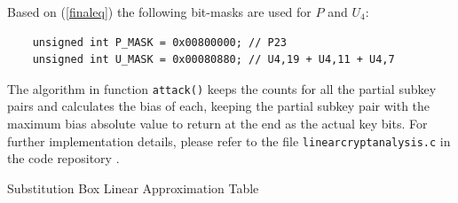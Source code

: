 \documentclass[11pt]{article}
\begin{document}
Based on (\ref{finaleq}) the following bit-masks are used for $P$ and $U_4$:

\begin{lstlisting}
	unsigned int P_MASK = 0x00800000; // P23
	unsigned int U_MASK = 0x00080880; // U4,19 + U4,11 + U4,7 
\end{lstlisting}

The algorithm in function {\tt attack()} keeps the counts for all the partial subkey pairs and calculates the bias of each, keeping the partial subkey pair with the maximum bias absolute value to return at the end as the actual key bits. For further implementation details, please refer to the file {\tt linearcryptanalysis.c} in the code repository \cite{lucasgithub}.



\nocite{*} 




\eject \pdfpagewidth=12in \pdfpageheight=11in
\thispagestyle{empty} %

\begin{table}
\setlength{\tabcolsep}{1pt}
\begin{center}
\footnotesize %



\caption{Substitution Box Linear Approximation Table}
\label{tab:sbox_approx_table}
\end{center}
\end{table}

\restoregeometry
\end{document}

